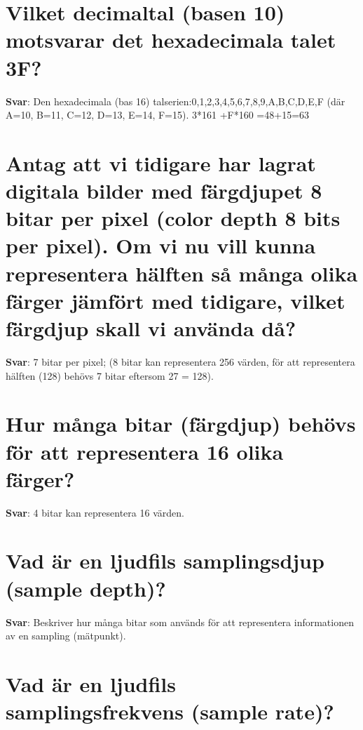\documentclass[a4paper,11pt,oneside]{book}
\begin{document}
\begin{sloppypar}
\section{Vilket decimaltal (basen 10) motsvarar det hexadecimala talet 3F?}

\label{q:78:sa:sv:True}

\textbf{Svar}: Den hexadecimala (bas 16) talserien:0,1,2,3,4,5,6,7,8,9,A,B,C,D,E,F (d\"ar A=10, B=11, C=12, D=13, E=14, F=15). 3*161 +F*160 =48+15=63



\section{Antag att vi tidigare har lagrat digitala bilder med f\"argdjupet 8 bitar per pixel (color depth 8 bits per pixel). Om vi nu vill kunna representera h\"alften s\r{a} m\r{a}nga olika f\"arger j\"amf\"ort med tidigare, vilket f\"argdjup skall vi anv\"anda d\r{a}?}

\label{q:79:sa:sv:True}

\textbf{Svar}: 7 bitar per pixel; (8 bitar kan representera 256 v\"arden, f\"or att representera h\"alften (128) beh\"ovs 7 bitar eftersom 27 = 128).



\section{Hur m\r{a}nga bitar (f\"argdjup) beh\"ovs f\"or att representera 16 olika f\"arger?}

\label{q:80:sa:sv:True}

\textbf{Svar}: 4 bitar kan representera 16 v\"arden.



\section{Vad \"ar en ljudfils samplingsdjup (sample depth)?}

\label{q:81:sa:sv:True}

\textbf{Svar}: Beskriver hur m\r{a}nga bitar som anv\"ands f\"or att representera informationen av en sampling (m\"atpunkt).



\section{Vad \"ar en ljudfils samplingsfrekvens (sample rate)?}


\end{sloppypar}
\end{document}
